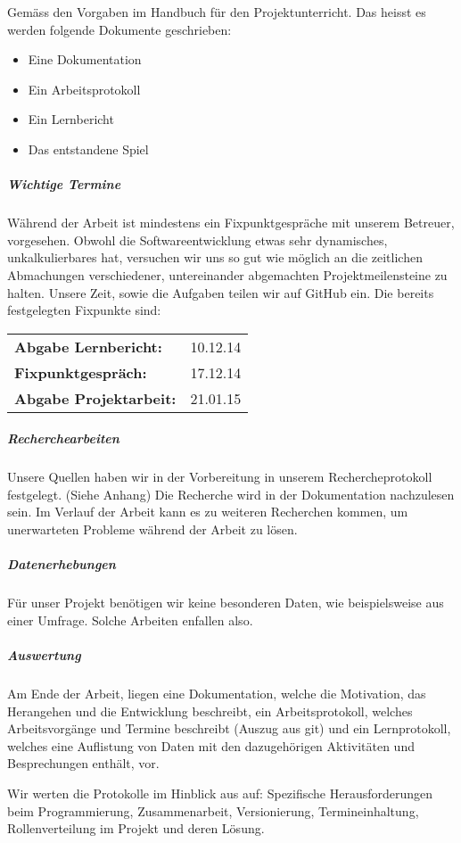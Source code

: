 \documentclass[parskip=half]{scrreprt}
\begin{document}
\begin{contract}
Gemäss den Vorgaben im Handbuch für den Projektunterricht. Das heisst es werden folgende Dokumente geschrieben:
\begin{itemize}
\item Eine Dokumentation
\item Ein Arbeitsprotokoll
\item Ein Lernbericht
\item Das entstandene Spiel
\end{itemize}

\subparagraph{Wichtige Termine}
Während der Arbeit ist mindestens ein Fixpunktgespräche mit unserem Betreuer, vorgesehen. Obwohl die Softwareentwicklung etwas sehr dynamisches, unkalkulierbares hat, versuchen wir uns so gut wie möglich an die zeitlichen Abmachungen verschiedener, untereinander abgemachten Projektmeilensteine zu halten. Unsere Zeit, sowie die Aufgaben teilen wir auf GitHub ein. Die bereits festgelegten Fixpunkte sind:

\begin{tabular}{ll}
\textbf{Abgabe Lernbericht:} & 10.12.14\\
\textbf{Fixpunktgespräch:} & 17.12.14\\
\textbf{Abgabe Projektarbeit:} & 21.01.15
\end{tabular}

\subparagraph{Recherchearbeiten}
Unsere Quellen haben wir in der Vorbereitung in unserem Rechercheprotokoll festgelegt. (Siehe Anhang) Die Recherche wird in der Dokumentation nachzulesen sein. Im Verlauf der Arbeit kann es zu weiteren Recherchen kommen, um unerwarteten Probleme während der Arbeit zu lösen.

\subparagraph{Datenerhebungen}
Für unser Projekt benötigen wir keine besonderen Daten, wie beispielsweise aus einer Umfrage. Solche Arbeiten
enfallen also.

\subparagraph{Auswertung}
Am Ende der Arbeit, liegen eine Dokumentation, welche die Motivation, das Herangehen und die Entwicklung beschreibt, ein Arbeitsprotokoll, welches Arbeitsvorgänge und Termine beschreibt (Auszug aus git) und ein Lernprotokoll, welches eine Auflistung von Daten mit den dazugehörigen Aktivitäten und Besprechungen enthält, vor. 

Wir werten die Protokolle im Hinblick aus auf: Spezifische Herausforderungen beim Programmierung, Zusammenarbeit, Versionierung, Termineinhaltung, Rollenverteilung im Projekt und deren Lösung.


\end{contract}
\end{document}
